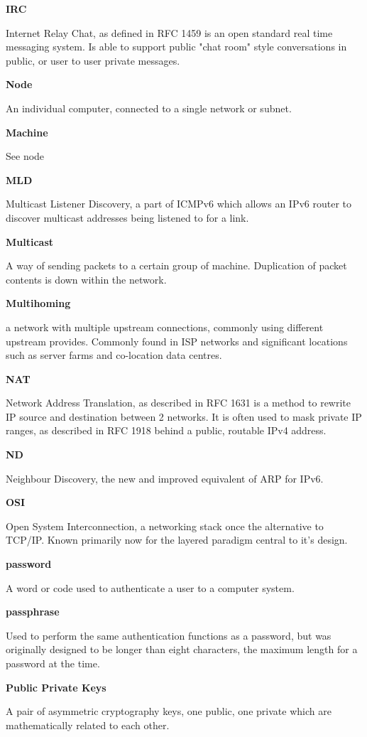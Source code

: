\textbf{IRC}

Internet Relay Chat, as defined in RFC 1459 is an open standard real
time messaging system. Is able to support public "chat room" style
conversations in public, or user to user private messages.

\textbf{Node}

An individual computer, connected to a single network or subnet.

\textbf{Machine}

See node

\textbf{MLD}

Multicast Listener Discovery, a part of ICMPv6 which allows an IPv6
router to discover multicast addresses being listened to for a link.

\textbf{Multicast}

A way of sending packets to a certain group of machine. Duplication of
packet contents is down within the network.

\textbf{Multihoming}

a network with multiple upstream connections, commonly using different
upstream provides. Commonly found in ISP networks and significant
locations such as server farms and co-location data centres.

\textbf{NAT}

Network Address Translation, as described in RFC 1631 is a method
to rewrite IP source and destination between 2 networks. It is often
used to mask private IP ranges, as described in RFC 1918 behind a 
public, routable IPv4 address. 

\textbf{ND}

Neighbour Discovery, the new and improved equivalent of ARP for IPv6.

\textbf{OSI}

Open System Interconnection, a networking stack once the alternative to
TCP/IP. Known primarily now for the layered paradigm central to it's
design.

\textbf{password}

A word or code used to authenticate a user to a computer system.

\textbf{passphrase}

Used to perform the same authentication functions as a password, but was
originally designed to be longer than eight characters, the maximum
length for a password at the time.

\textbf{Public Private Keys}

A pair of asymmetric cryptography keys, one public, one private which 
are mathematically related to each other. 

